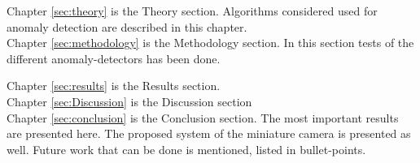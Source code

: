 Chapter \ref{sec:theory} is the Theory section.  Algorithms considered used for anomaly detection are described in this chapter.  \\


Chapter \ref{sec:methodology} is the Methodology section. In this section tests of the different anomaly-detectors has been done.  


Chapter \ref{sec:results} is the Results section. 
\\

Chapter \ref{sec:Discussion} is the Discussion section
\\

Chapter \ref{sec:conclusion} is the Conclusion section. The most important results are presented here. The proposed system of the miniature camera is presented as well. Future work that can be done is mentioned, listed in bullet-points. 
\\




